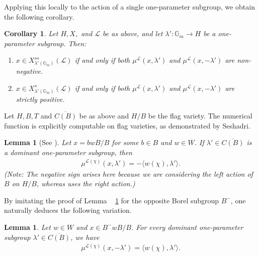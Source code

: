 \documentclass[12pt, reqno]{amsart}
\theoremstyle{plain}
\numberwithin{equation}{section}
\newtheorem{corollary}[theorem]{Corollary}
\newtheorem{lemma}[theorem]{Lemma}
\theoremstyle{definition}
\begin{document}
Applying this locally to the action of a single one-parameter subgroup, we obtain the following corollary.

\begin{corollary}\label{HM-corollary}
    Let $H, X,$ and $\mathcal{L}$ be as above, and let $\lambda' \colon \mathbb{G}_m \to H$ be a one-parameter subgroup. Then:
    \begin{enumerate}
        \item $x \in X^{ss}_{\lambda'(\mathbb{G}_m)}(\mathcal{L})$ if and only if both $\mu^{\mathcal{L}}(x, \lambda')$ and $\mu^{\mathcal{L}}(x, -\lambda')$ are non-negative.
        \item $x \in X^s_{\lambda'(\mathbb{G}_m)}(\mathcal{L})$ if and only if both $\mu^{\mathcal{L}}(x, \lambda')$ and $\mu^{\mathcal{L}}(x, -\lambda')$ are strictly positive.
    \end{enumerate}
\end{corollary}

Let $H, B, T$ and $\overline{C(B)}$ be as above and $H/B$ be the flag variety. The numerical function is explicitly computable on flag varieties, as demonstrated by Seshadri.

\begin{lemma}[{See \cite[Lemma 5.1]{Ses2}}]\label{CSS}
    Let $x = bwB/B$ for some $b \in B$ and $w \in W$. If $\lambda' \in \overline{C(B)}$ is a dominant one-parameter subgroup, then
    \begin{align*}
        \mu^{\mathcal{L}(\chi)}(x, \lambda') = -\langle w(\chi), \lambda' \rangle.
    \end{align*}
    \textit{(Note: The negative sign arises here because we are considering the left action of $B$ on $H/B$, whereas \cite[Lemma 5.1]{Ses2} uses the right action.)}
\end{lemma}

By imitating the proof of Lemma ~ \ref{CSS} for the opposite Borel subgroup $B^-$, one naturally deduces the following variation.

\begin{lemma}\label{variation of Seshadri's lemma}
    Let $w \in W$ and $x \in B^-wB/B$. For every dominant one-parameter subgroup $\lambda' \in \overline{C(B)}$, we have
    \begin{align*}
        \mu^{\mathcal{L}(\chi)}(x, -\lambda') = \langle w(\chi), \lambda' \rangle.
    \end{align*}
\end{lemma}
\end{document}
